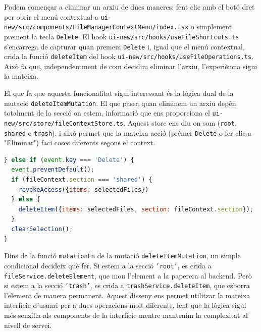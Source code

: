 Podem començar a eliminar un arxiu de dues maneres: fent clic amb el botó dret per obrir el menú contextual a \texttt{ui-new/src/components/FileManagerContextMenu/index.tsx} o simplement prement la tecla \texttt{Delete}. El hook \texttt{ui-new/src/hooks/useFileShortcuts.ts} s'encarrega de capturar quan premem \texttt{Delete} i, igual que el menú contextual, crida la funció \texttt{deleteItem} del hook \texttt{ui-new/src/hooks/useFileOperations.ts}. Això fa que, independentment de com decidim eliminar l'arxiu, l'experiència sigui la mateixa.

El que fa que aquesta funcionalitat sigui interessant és la lògica dual de la mutació \texttt{deleteItemMutation}. El que passa quan eliminem un arxiu depèn totalment de la secció on estem, informació que ens proporciona el \texttt{ui-new/src/store/fileContextStore.ts}. Aquest store ens diu on som (\texttt{root}, \texttt{shared} o \texttt{trash}), i això permet que la mateixa acció (prémer \texttt{Delete} o fer clic a "Eliminar") faci coses diferents segons el context.

\begin{lstlisting}[language=javascript, caption={Gestió de la tecla Delete a `useFileShortcuts.ts`}]
} else if (event.key === 'Delete') {
  event.preventDefault();
  if (fileContext.section === 'shared') {
    revokeAccess({items: selectedFiles})
  } else {
    deleteItem({items: selectedFiles, section: fileContext.section});
  }
  clearSelection();
}
\end{lstlisting}

Dins de la funció \texttt{mutationFn} de la mutació \texttt{deleteItemMutation}, un simple condicional decideix què fer. Si estem a la secció \texttt{'root'}, es crida a \texttt{fileService.deleteElement}, que mou l'element a la paperera al backend. Però si estem a la secció \texttt{'trash'}, es crida a \texttt{trashService.deleteItem}, que esborra l'element de manera permanent. Aquest disseny ens permet utilitzar la mateixa interfície d'usuari per a dues operacions molt diferents, fent que la lògica sigui més senzilla als components de la interfície mentre mantenim la complexitat al nivell de servei.

